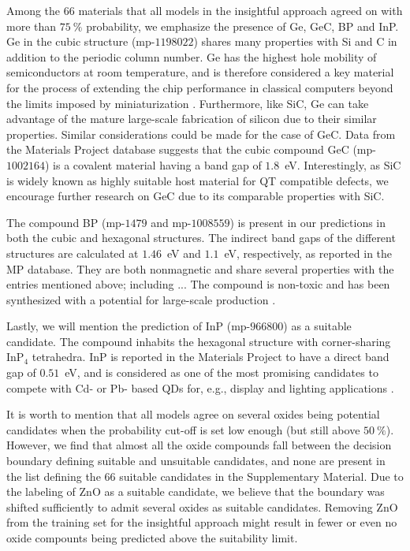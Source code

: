 \documentclass[superscriptaddress,unsortedaddress,
 amsmath,amssymb,
 aps,
]{revtex4-2}
\begin{document}
Among the $66$ materials that all models in the insightful approach agreed on with more than $75 \ \%$ probability, we emphasize the presence of Ge, GeC, BP and InP. Ge in the cubic structure (mp-$1198022$) shares many properties with Si and C in addition to the periodic column number. 
Ge has the highest hole mobility of semiconductors at room temperature, and is therefore considered a key material for the process of extending the chip performance in classical computers beyond the limits imposed by miniaturization  \cite{Scappucci2020}. Furthermore, like SiC, Ge can take advantage of the mature large-scale fabrication of silicon due to their similar properties. 
Similar considerations could be made for the case of GeC. 
Data from the Materials Project database suggests that the cubic compound GeC (mp-$1002164$) is a covalent material having a band gap of $1.8$~eV. 
Interestingly, as SiC is widely known as highly suitable host material for QT compatible defects, we encourage further research on GeC due to its comparable properties with SiC.

The compound BP (mp-$1479$ and mp-$1008559$) is present in our predictions in both the cubic and hexagonal structures. The indirect band gaps of the different structures are calculated at $1.46$~eV and $1.1$~eV, respectively, as reported in the MP database. They are both nonmagnetic and share several properties with the entries mentioned above; including ... The compound is non-toxic and has been synthesized with a potential for large-scale production \cite{MukhanovVladimirA2016Umso}.

Lastly, we will mention the prediction of InP (mp-$966800$) as a suitable candidate. The compound inhabits the hexagonal structure with corner-sharing InP$_4$ tetrahedra. InP is reported in the Materials Project to have a direct band gap of $0.51$~eV, and is considered as one of the most promising candidates 
to compete with 
Cd- or Pb- based QDs for, e.g., display and lighting applications \cite{Zhang2020a, Won2019}.

It is worth to mention that all models agree on several oxides being potential candidates when the probability cut-off is set low enough (but still above $50 \ \%$). However, we find that almost all the oxide compounds fall between the decision boundary defining suitable and unsuitable candidates, and none are present in the list defining the $66$ suitable candidates in the Supplementary Material. Due to the labeling of ZnO as a suitable candidate, we believe that the boundary was shifted sufficiently to admit several oxides as suitable candidates.
Removing ZnO from the training set for the insightful approach might result in fewer or even no oxide compounts being predicted above the suitability limit. 
\end{document}
